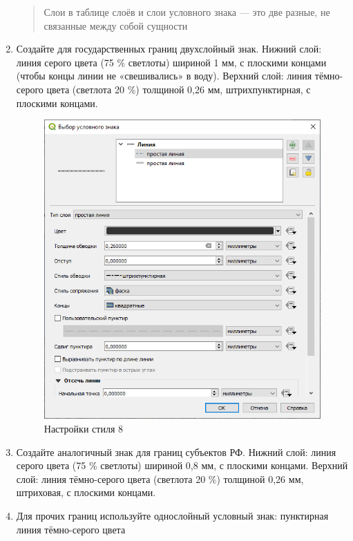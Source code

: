\documentclass[
  12pt,
]{book}
\begin{document}
\begin{enumerate}
  \begin{quote}
  Слои в таблице слоёв и слои условного знака --- это две разные, не связанные между собой сущности
  \end{quote}
\item
  Создайте для государственных границ двухслойный знак. Нижний слой: линия серого цвета (75 \% светлоты) шириной 1 мм, с плоскими концами (чтобы концы линии не «свешивались» в воду). Верхний слой: линия тёмно-серого цвета (светлота 20 \%) толщиной 0,26 мм, штрихпунктирная, с плоскими концами.

  \begin{figure}
  \centering
  \includegraphics{images/Ex01/style8.png}
  \caption{Настройки стиля 8}
  \end{figure}
\item
  Создайте аналогичный знак для границ субъектов РФ. Нижний слой: линия серого цвета (75 \% светлоты) шириной 0,8 мм, с плоскими концами. Верхний слой: линия тёмно-серого цвета (светлота 20 \%) толщиной 0,26 мм, штриховая, с плоскими концами.
\item
  Для прочих границ используйте однослойный условный знак: пунктирная линия тёмно-серого цвета
\end{enumerate}
\end{document}
